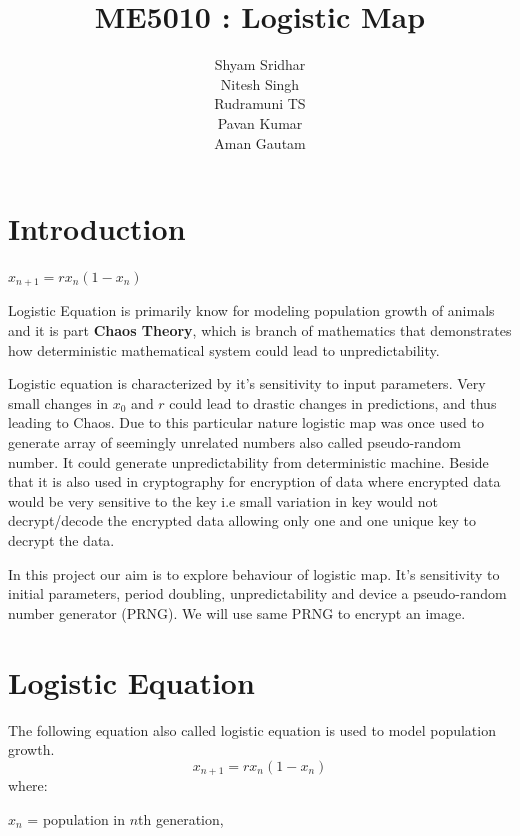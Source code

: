 \documentclass{report}
\title{\textbf{ME5010 : Logistic Map}}
\begin{document}
\author{Shyam Sridhar\\ Nitesh Singh \\ Rudramuni TS \\ Pavan Kumar \\ Aman Gautam }
\maketitle

\section{Introduction}

\begin{center}$x_{n+1} = rx_n(1-x_n)$\end{center}
Logistic Equation is primarily know for modeling population growth of animals and it is part \textbf{Chaos Theory}, which is branch of mathematics that demonstrates how deterministic mathematical system could lead to unpredictability.

Logistic equation is characterized by it's sensitivity to input parameters. Very small changes in $x_0$ and $r$ could lead to drastic changes in predictions, and thus leading to Chaos. Due to this particular nature logistic map was once used to generate array of seemingly unrelated numbers also called pseudo-random number. It could generate unpredictability from deterministic machine. Beside that it is also used in cryptography for encryption of data where encrypted data would be very sensitive to the key i.e small variation in key would not decrypt/decode the encrypted data allowing only one and one unique key to decrypt the data.

In this project our aim is to explore behaviour of logistic map. It's sensitivity to initial parameters, period doubling, unpredictability and device a pseudo-random number generator (PRNG). We will use same PRNG to encrypt an image.



\newpage
\section{Logistic Equation}

The following equation also called logistic equation is used to model population growth.
\begin{equation}
x_{n+1} = rx_n(1-x_n)
\end{equation}
where:

$x_n$ = population in $n$th generation,
\end{document}
